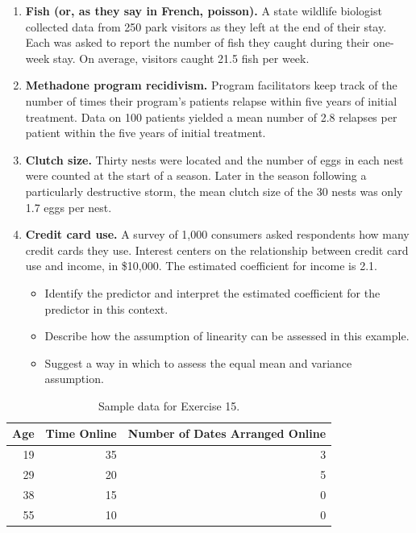 \documentclass[
]{krantz}
\providecommand{\tightlist}{%
  \setlength{\itemsep}{0pt}\setlength{\parskip}{0pt}}
\begin{document}
\begin{enumerate}
\def\labelenumi{\arabic{enumi}.}
\setcounter{enumi}{10}
\item
  \textbf{Fish (or, as they say in French, poisson).} A state wildlife biologist collected data from 250 park visitors as they left at the end of their stay. Each was asked to report the number of fish they caught during their one-week stay. On average, visitors caught 21.5 fish per week.
\item
  \textbf{Methadone program recidivism.} Program facilitators keep track of the number of times their program's patients relapse within five years of initial treatment. Data on 100 patients yielded a mean number of 2.8 relapses per patient within the five years of initial treatment.
\item
  \textbf{Clutch size.} Thirty nests were located and the number of eggs in each nest were counted at the start of a season. Later in the season following a particularly destructive storm, the mean clutch size of the 30 nests was only 1.7 eggs per nest.
  \vspace{3mm}
\item
  \textbf{Credit card use.} A survey of 1,000 consumers asked respondents how many credit cards they use. Interest centers on the relationship between credit card use and income, in \$10,000. The estimated coefficient for income is 2.1.

  \begin{itemize}
  \tightlist
  \item
    Identify the predictor and interpret the estimated coefficient for the predictor in this context.
  \item
    Describe how the assumption of linearity can be assessed in this example.
  \item
    Suggest a way in which to assess the equal mean and variance assumption.
  \end{itemize}
\end{enumerate}

\begin{table}

\caption{\label{tab:tab2chp4}Sample data for Exercise 15.}
\centering
\begin{tabular}[t]{rrr}
\toprule
Age & Time Online & Number of Dates Arranged Online\\
\midrule
19 & 35 & 3\\
29 & 20 & 5\\
38 & 15 & 0\\
55 & 10 & 0\\
\bottomrule
\end{tabular}
\end{table}
\end{document}
